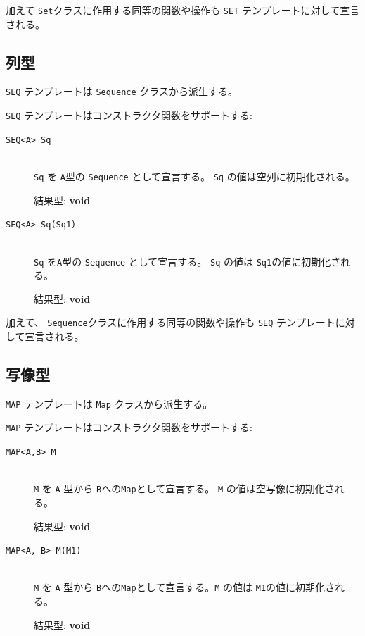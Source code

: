 \documentclass[\pformat,12pt]{jarticle}
\begin{document}
加えて {\tt Set}クラスに作用する同等の関数や操作も {\tt SET} テンプレートに対して宣言される。

\subsection{列型}

 {\tt SEQ} テンプレートは {\tt Sequence} クラスから派生する。

 {\tt SEQ} テンプレートはコンストラクタ関数をサポートする:

\begin{description}
\item[{\tt SEQ<A> Sq}] \mbox{}\\
 {\tt Sq} を {\tt A}型の {\tt Sequence} として宣言する。 {\tt Sq} の値は空列に初期化される。

結果型: {\bf void}

\item[{\tt SEQ<A> Sq(Sq1)}] \mbox{} \\
 {\tt Sq} を{\tt A}型の {\tt Sequence} として宣言する。 {\tt Sq} の値は {\tt Sq1}の値に初期化される。

結果型: {\bf void}

\end{description}

加えて、 {\tt Sequence}クラスに作用する同等の関数や操作も {\tt SEQ} テンプレートに対して宣言される。

\subsection{写像型}

 {\tt MAP} テンプレートは {\tt Map} クラスから派生する。

 {\tt MAP} テンプレートはコンストラクタ関数をサポートする:

\begin{description}
\item[{\tt MAP<A,B> M}] \mbox{}\\
 {\tt M} を {\tt A} 型から {\tt B}への{\tt Map}として宣言する。 {\tt M} の値は空写像に初期化される。

結果型: {\bf void}

\item[{\tt MAP<A, B> M(M1)}] \mbox{} \\
 {\tt M} を {\tt A} 型から {\tt B}への{\tt Map}として宣言する。{\tt M} の値は {\tt M1}の値に初期化される。

結果型: {\bf void}

\end{description}
\end{document}
